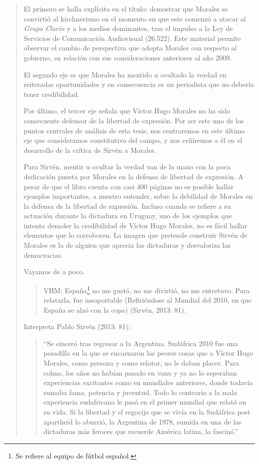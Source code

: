 \begin{quote}
El primero se halla explícito en el título: demostrar que Morales se convirtió al kirchnerismo en el momento en que este comenzó a atacar al \emph{Grupo Clarín} y a los medios dominantes, tras el impulso a la Ley de Servicios de Comunicación Audiovisual (26.522). Este material permite observar el cambio de perspectiva que adopta Morales con respecto al gobierno, en relación con sus consideraciones anteriores al año 2009.

El segundo eje es que Morales ha mentido u ocultado la verdad en reiteradas oportunidades y en consecuencia es un periodista que no debería tener credibilidad.

Por último, el tercer eje señala que Víctor Hugo Morales no ha sido consecuente defensor de la libertad de expresión. Por ser este uno de los puntos centrales de análisis de esta tesis, nos centraremos en este último eje que consideramos constitutivo del campo, y nos ceñiremos a él en el desarrollo de la crítica de Sirvén a Morales.

Para Sirvén, mentir u ocultar la verdad van de la mano con la poca dedicación puesta por Morales en la defensa de libertad de expresión. A pesar de que el libro cuenta con casi 400 páginas no es posible hallar ejemplos importantes, a nuestro entender, sobre la debilidad de Morales en la defensa de la libertad de expresión. Incluso cuando se refiere a su actuación durante la dictadura en Uruguay, uno de los ejemplos que intenta demoler la credibilidad de Víctor Hugo Morales, no es fácil hallar elementos que lo corroboren. La imagen que pretende construir Sirvén de Morales es la de alguien que aprecia las dictaduras y desvaloriza las democracias.

Vayamos de a poco.

\begin{quote}
	VHM: España\footnote{Se refiere al equipo de fútbol español.} no me gustó, no me divirtió, no me entretuvo. Para relatarla, fue insoportable (Refiriéndose al Mundial del 2010, en que España se alzó con la copa) (Sirvén, 2013: 81).
\end{quote}


Interpreta Pablo Sirvén (2013: 81):

\begin{quote}
	\enquote{Se sinceró tras regresar a la Argentina. Sudáfrica 2010 fue una pesadilla en la que se encarnaron las peores cosas que a Víctor Hugo Morales, como persona y como relator, no le daban placer. Para colmo, los años no habían pasado en vano y ya no lo esperaban experiencias excitantes como en mundiales anteriores, donde todavía sumaba fama, potencia y juventud. Todo lo contrario a la mala experiencia sudafricana le pasó en el primer mundial que relató en su vida. Si la libertad y el regocijo que se vivía en la Sudáfrica post apartheid lo aburrió, la Argentina de 1978, sumida en una de las dictaduras más feroces que recuerde América latina, lo fascinó.}
\end{quote}



\end{quote}
